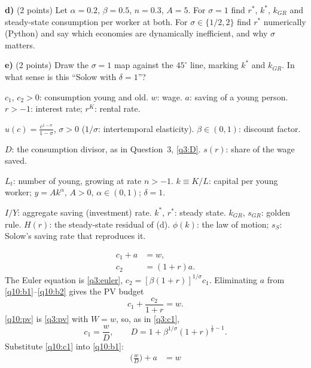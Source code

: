\textbf{d)} (2 points) Let $\alpha=0.2$, $\beta=0.5$, $n=0.3$, $A=5$. For $\sigma=1$ find $r^\ast$, $k^\ast$, $k_{GR}$ and steady-state consumption per
worker at both. For $\sigma\in\{1/2,2\}$ find $r^\ast$ numerically (Python) and say which economies are dynamically inefficient, and why
$\sigma$ matters.

\textbf{e)} (2 points) Draw the $\sigma=1$ map against the $45^\circ$ line, marking $k^\ast$ and $k_{GR}$. In what sense is this ``Solow with $\delta=1$''?
\resolespaco
\begin{sol}
\begin{notacao}
\item $c_1$, $c_2>0$: consumption young and old. $w$: wage. $a$: saving of a young person. $r>-1$: interest rate; $r^K$: rental rate.
\item $u(c)=\frac{c^{1-\sigma}}{1-\sigma}$, $\sigma>0$ ($1/\sigma$: intertemporal elasticity). $\beta\in(0,1)$: discount factor.
\item $D$: the consumption divisor, as in Question~3, \eqref{q3:D}. $s(r)$: share of the wage saved.
\item $L_t$: number of young, growing at rate $n>-1$. $k\equiv K/L$: capital per young worker; $y=Ak^\alpha$, $A>0$, $\alpha\in(0,1)$;
$\delta=1$.
\item $I/Y$: aggregate saving (investment) rate. $k^\ast$, $r^\ast$: steady state. $k_{GR}$, $s_{GR}$: golden rule. $H(r)$: the
steady-state residual of (d). $\phi(k)$: the law of motion; $s_S$: Solow's saving rate that reproduces it.
\end{notacao}
\begin{align}
c_1+a &= w, \label{q10:b1}\\
c_2 &= (1+r)a. \label{q10:b2}
\end{align}
The Euler equation is \eqref{q3:euler}, $c_2=[\beta(1+r)]^{1/\sigma}c_1$. Eliminating $a$ from \eqref{q10:b1}--\eqref{q10:b2} gives the PV
budget
\begin{equation}
c_1+\frac{c_2}{1+r}=w. \label{q10:pv}
\end{equation}
\eqref{q10:pv} is \eqref{q3:pv} with $W=w$, so, as in \eqref{q3:c1},
\begin{equation}
c_1=\frac wD,\qquad D=1+\beta^{1/\sigma}(1+r)^{\frac1\sigma-1}. \label{q10:c1}
\end{equation}
Substitute \eqref{q10:c1} into \eqref{q10:b1}:
\begin{align}
\Big(\frac wD\Big)+a &= w\nonumber\\

\end{align}
\end{sol}
